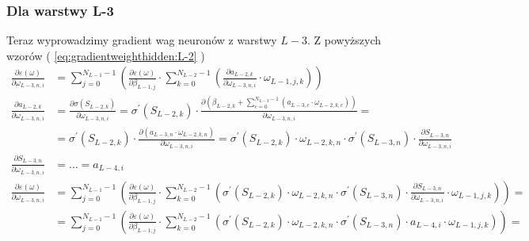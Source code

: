 \documentclass[]{article}
\begin{document}
			
		\subsubsection{Dla warstwy L-3}
			Teraz wyprowadzimy gradient wag neuronów z warstwy $L-3$. Z powyższych wzorów ( \ref{eq:gradientweighthidden:L-2} )
			\begin{equation} \label{eq:gradientweighthidden:L-3}
				\begin{split}
					\frac{ \partial \varepsilon\left( \omega \right) }{ \partial \omega_{L-3,n,i} } &= \sum\limits_{j=0}^{N_{L-1}-1} \left( \frac{ \partial \varepsilon \left(\omega\right) }{ \partial \beta_{L-1,j} } \cdot \sum\limits_{k=0}^{N_{L-2}-1} \left( \frac{ \partial a_{L-2,k} }{ \partial \omega_{L-3,n,i} } \cdot \omega_{L-1,j,k} \right) \right) \\
					\frac{ \partial a_{L-2,k} }{ \partial \omega_{L-3,n,i} } &= \frac{ \partial \sigma \left( S_{L-2,k} \right) }{ \partial \omega_{L-3,n,i} } = \sigma^{\prime} \left( S_{L-2,k} \right) \cdot \frac{ \partial \left( \beta_{L-2,k} + \sum\limits_{c=0}^{N_{L-3}-1} \left( a_{L-3,c} \cdot \omega_{L-2,k,c} \right) \right) }{ \partial \omega_{L-3,n,i} } = \\
					&= \sigma^{\prime} \left( S_{L-2,k} \right) \cdot \frac{ \partial \left( a_{L-3,n} \cdot \omega_{L-2,k,n} \right) }{ \partial \omega_{L-3,n,i} } = \sigma^{\prime} \left( S_{L-2,k} \right) \cdot \omega_{L-2,k,n} \cdot \sigma^{\prime} \left( S_{L-3,n} \right) \cdot \frac{ \partial S_{L-3,n} }{ \partial \omega_{L-3,n,i} } \\
					\frac{ \partial S_{L-3,n} }{ \partial \omega_{L-3,n,i} } &= \ldots = a_{L-4,i} \\
					\frac{ \partial \varepsilon\left( \omega \right) }{ \partial \omega_{L-3,n,i} } &= \sum\limits_{j=0}^{N_{L-1}-1} \left( \frac{ \partial \varepsilon \left(\omega\right) }{ \partial \beta_{L-1,j} } \cdot \sum\limits_{k=0}^{N_{L-2}-1} \left( \sigma^{\prime} \left( S_{L-2,k} \right) \cdot \omega_{L-2,k,n} \cdot \sigma^{\prime} \left( S_{L-3,n} \right) \cdot \frac{ \partial S_{L-3,n} }{ \partial \omega_{L-3,n,i} } \cdot \omega_{L-1,j,k} \right) \right) = \\
					&= \sum\limits_{j=0}^{N_{L-1}-1} \left( \frac{ \partial \varepsilon \left(\omega\right) }{ \partial \beta_{L-1,j} } \cdot \sum\limits_{k=0}^{N_{L-2}-1} \left( \sigma^{\prime} \left( S_{L-2,k} \right) \cdot \omega_{L-2,k,n} \cdot \sigma^{\prime} \left( S_{L-3,n} \right) \cdot a_{L-4,i} \cdot \omega_{L-1,j,k} \right) \right) = \\

\end{split}
\end{equation}
\end{document}
